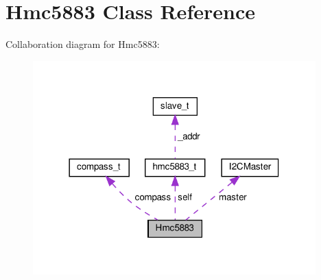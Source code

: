 \hypertarget{classHmc5883}{}\section{Hmc5883 Class Reference}
\label{classHmc5883}


Collaboration diagram for Hmc5883\+:\nopagebreak
\begin{figure}[H]
\begin{center}
\leavevmode
\includegraphics[width=309pt]{classHmc5883__coll__graph}
\end{center}
\end{figure}
